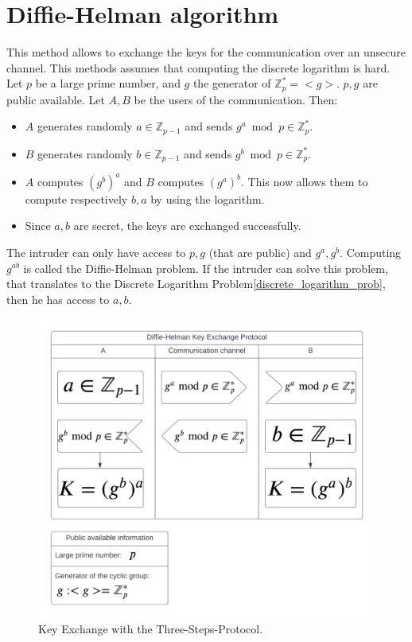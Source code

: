 \section{Diffie-Helman algorithm}
This method allows to exchange the keys for the communication over an unsecure channel. This methods assumes that computing the discrete logarithm is hard.\newline
Let $p$ be a large prime number, and $g$ the generator of $\mathbb{Z}_{p}^{*} = <g>$. $p, g$ are public available.
Let $A, B$ be the users of the communication. Then:
\begin{itemize}
    \item $A$ generates randomly $a \in \mathbb{Z}_{p-1}$ and sends $g^{a} \bmod p \in \mathbb{Z}_{p}^{*}$.
    \item $B$ generates randomly $b \in \mathbb{Z}_{p-1}$ and sends $g^{b} \bmod p \in \mathbb{Z}_{p}^{*}$.
    \item $A$ computes $(g^{b})^{a}$ and $B$ computes $(g^{a})^{b}$. This now allows them to compute respectively $b, a$ by using the logarithm.
    \item Since $a, b$ are secret, the keys are exchanged successfully.
\end{itemize}

The intruder can only have access to $p, g$ (that are public) and $g^{a}, g^{b}$. Computing $g^{ab}$ is called the Diffie-Helman problem.\newline
If the intruder can solve this problem, that translates to the Discrete Logarithm Problem\ref{discrete_logarithm_prob}, then he has access to $a, b$.

\begin{figure}[h]
    \centering
    \includegraphics[width=\textwidth]{img/KeyExc_DHP.png}
    \caption{Key Exchange with the Three-Steps-Protocol.}
\end{figure}
